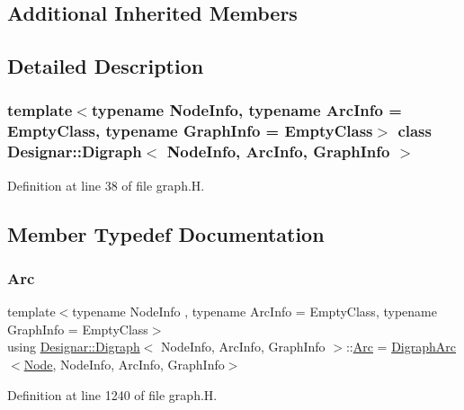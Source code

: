 \subsection*{Additional Inherited Members}


\subsection{Detailed Description}
\subsubsection*{template$<$typename Node\+Info, typename Arc\+Info = Empty\+Class, typename Graph\+Info = Empty\+Class$>$\newline
class Designar\+::\+Digraph$<$ Node\+Info, Arc\+Info, Graph\+Info $>$}



Definition at line 38 of file graph.\+H.



\subsection{Member Typedef Documentation}
\mbox{\label{class_designar_1_1_digraph_a0ceb278671f2a535c00fddccdeafd69f}} 
\subsubsection{\texorpdfstring{Arc}{Arc}}
{\footnotesize\ttfamily template$<$typename Node\+Info , typename Arc\+Info  = Empty\+Class, typename Graph\+Info  = Empty\+Class$>$ \\
using \hyperlink{class_designar_1_1_digraph}{Designar\+::\+Digraph}$<$ Node\+Info, Arc\+Info, Graph\+Info $>$\+::\hyperlink{class_designar_1_1_digraph_a0ceb278671f2a535c00fddccdeafd69f}{Arc} =  \hyperlink{class_designar_1_1_digraph_arc}{Digraph\+Arc}$<$\hyperlink{class_designar_1_1_digraph_a4dc921c41a480b7946a04170e997d8ae}{Node}, Node\+Info, Arc\+Info, Graph\+Info$>$}



Definition at line 1240 of file graph.\+H.

\mbox{\label{class_designar_1_1_digraph_a84a736f6c32da0fcbd1d047e74264d00}} 
